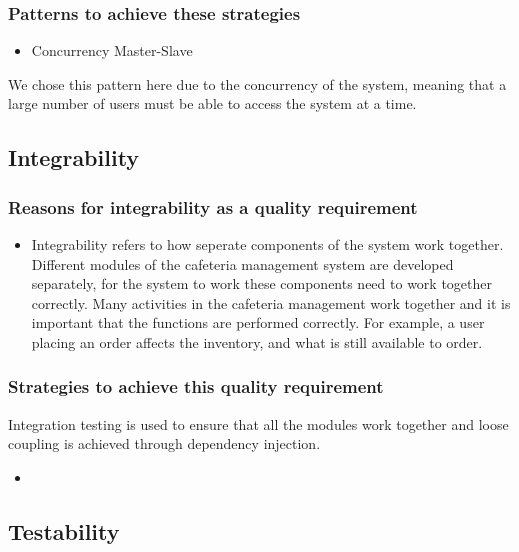 \documentclass[a4paper,12pt]{article}
\begin{document}
\subsubsection{Patterns to achieve these strategies}
\begin{itemize}
\item Concurrency Master-Slave 
\end{itemize}
We chose this pattern here due to the concurrency of the system, meaning that a large number of users must be able to access the system at a time.

\subsection{Integrability}
\subsubsection{Reasons for integrability as a quality requirement}
\begin{itemize}
\item  Integrability refers to how seperate components of the system work together. Different modules of the cafeteria management system are developed separately, for the system to work these components need to work together correctly. Many activities in the cafeteria management work together and it is important that the functions are performed correctly. For example, a user placing an order affects the inventory, and what is still available to order.
\end{itemize}

\subsubsection{Strategies to achieve this quality requirement}
Integration testing is used to ensure that all the modules work together and loose coupling is achieved through dependency injection.
\begin{itemize}
\item 
\end{itemize}



\subsection{Testability}
\end{document}
